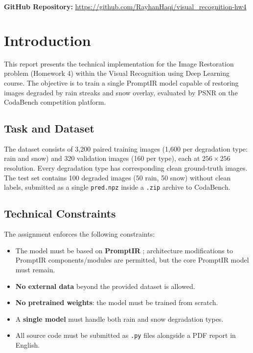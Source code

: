 \documentclass[12pt, a4paper]{article}
\author{
    Muhammad Rayhan Athaillah \begin{CJK*}{UTF8}{bsmi}(賴瑞涵)\end{CJK*}\\
    \small Student ID: 313540001\\
    \small National Yang Ming Chiao Tung University
}
\date{\today}
\begin{document}
\maketitle

\vspace{0.5cm}
\noindent \textbf{GitHub Repository:} \href{https://github.com/RayhanHaqi/visual\_recognition-hw4}{https://github.com/RayhanHaqi/visual\_recognition-hw4}

\section{Introduction}
This report presents the technical implementation for the Image Restoration problem (Homework 4) within the Visual Recognition using Deep Learning course. The objective is to train a single PromptIR model \cite{potlapalli2023} capable of restoring images degraded by rain streaks and snow overlay, evaluated by PSNR on the CodaBench competition platform.

\subsection{Task and Dataset}
The dataset consists of 3,200 paired training images (1,600 per degradation type: rain and snow) and 320 validation images (160 per type), each at $256 \times 256$ resolution. Every degradation type has corresponding clean ground-truth images. The test set contains 100 degraded images (50 rain, 50 snow) without clean labels, submitted as a single \texttt{pred.npz} inside a \texttt{.zip} archive to CodaBench.

\subsection{Technical Constraints}
The assignment enforces the following constraints:
\begin{itemize}
    \item The model must be based on \textbf{PromptIR} \cite{potlapalli2023}; architecture modifications to PromptIR components/modules are permitted, but the core PromptIR model must remain.
    \item \textbf{No external data} beyond the provided dataset is allowed.
    \item \textbf{No pretrained weights}: the model must be trained from scratch.
    \item A \textbf{single model} must handle both rain and snow degradation types.
    \item All source code must be submitted as \texttt{.py} files alongside a PDF report in English.
\end{itemize}
\end{document}
